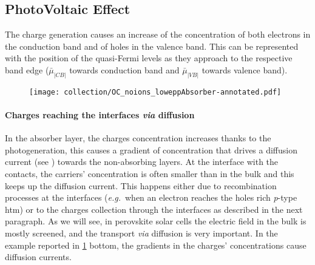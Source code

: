 	\subsection{PhotoVoltaic Effect}
		The charge generation causes an increase of the concentration of both electrons in the conduction band and of holes in the valence band.
		This can be represented with the position of the quasi\hyp{}Fermi levels as they approach to the respective band edge ($\bar\mu_|CB|$ towards conduction band and $\bar\mu_|VB|$ towards valence band).


		\begin{figure}
			\centering
			\texttt{[image: collection/OC\_noions\_loweppAbsorber-annotated.pdf]}
			\label{fig:collection}
		\end{figure}

		\paragraph{Charges reaching the interfaces \textsl{via} diffusion}
		In the absorber layer, the charges concentration increases thanks to the photogeneration, this causes a gradient of concentration that drives a diffusion current (see ) towards the non\hyp{}absorbing layers.
		At the interface with the contacts, the carriers' concentration is often smaller than in the bulk and this keeps up the diffusion current.
		This happens either due to recombination processes at the interfaces (\textsl{e.g.}\ when an electron reaches the holes rich \textit{p}-type \gls{htm}) or to the charges collection through the interfaces as described in the next paragraph.
		As we will see, in perovskite solar cells the electric field in the bulk is mostly screened, and the transport \textsl{via} diffusion is very important.
		In the example reported in \cref{fig:collection} bottom, the gradients in the charges' concentrations cause diffusion currents.

